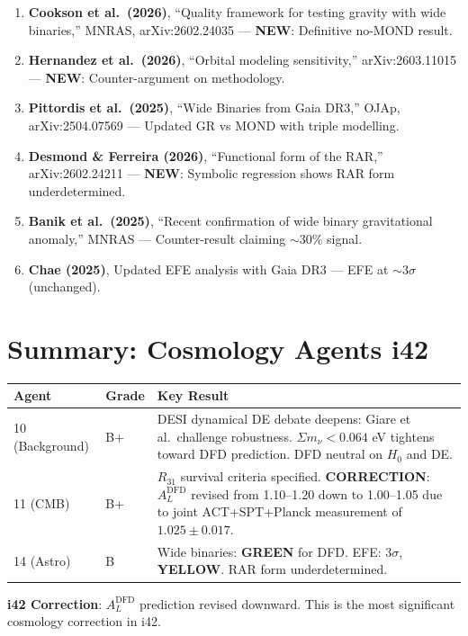 \documentclass[11pt,a4paper]{article}
\newcommand{\GREEN}{\textcolor{dfdgreen}{\textbf{GREEN}}}
\newcommand{\YELLOW}{\textcolor{dfdyellow}{\textbf{YELLOW}}}
\newcommand{\NEW}{\textcolor{dfdblue}{\textbf{NEW}}}
\begin{document}
\begin{enumerate}
\item \textbf{Cookson et al.\ (2026)}, ``Quality framework for testing gravity with wide binaries,'' MNRAS, arXiv:2602.24035 --- \NEW: Definitive no-MOND result.

\item \textbf{Hernandez et al.\ (2026)}, ``Orbital modeling sensitivity,'' arXiv:2603.11015 --- \NEW: Counter-argument on methodology.

\item \textbf{Pittordis et al.\ (2025)}, ``Wide Binaries from Gaia DR3,'' OJAp, arXiv:2504.07569 --- Updated GR vs MOND with triple modelling.

\item \textbf{Desmond \& Ferreira (2026)}, ``Functional form of the RAR,'' arXiv:2602.24211 --- \NEW: Symbolic regression shows RAR form underdetermined.

\item \textbf{Banik et al.\ (2025)}, ``Recent confirmation of wide binary gravitational anomaly,'' MNRAS --- Counter-result claiming $\sim 30\%$ signal.

\item \textbf{Chae (2025)}, Updated EFE analysis with Gaia DR3 --- EFE at $\sim 3\sigma$ (unchanged).
\end{enumerate}


\section*{Summary: Cosmology Agents i42}

\begin{center}
\begin{tabular}{llp{8cm}}
\toprule
\textbf{Agent} & \textbf{Grade} & \textbf{Key Result} \\
\midrule
10 (Background) & B+ & DESI dynamical DE debate deepens: Giare et al.\ challenge robustness. $\Sigma m_\nu < 0.064$ eV tightens toward DFD prediction. DFD neutral on $H_0$ and DE. \\
11 (CMB) & B+ & $R_{31}$ survival criteria specified. \textbf{CORRECTION}: $A_L^{\mathrm{DFD}}$ revised from 1.10--1.20 down to 1.00--1.05 due to joint ACT+SPT+Planck measurement of $1.025 \pm 0.017$. \\
14 (Astro) & B & Wide binaries: \GREEN{} for DFD. EFE: $3\sigma$, \YELLOW{}. RAR form underdetermined. \\
\bottomrule
\end{tabular}
\end{center}

\textbf{i42 Correction}: $A_L^{\mathrm{DFD}}$ prediction revised downward. This is the most significant cosmology correction in i42.
\end{document}
